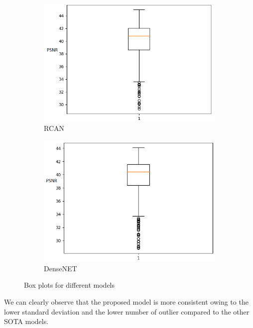 \begin{figure}[H]
  \begin{subfigure}[b]{0.275\textwidth}
    \includegraphics[width=\textwidth]{Chapter7/rcan_y.png}
    \caption{RCAN}
  \end{subfigure}
  \begin{subfigure}[b]{0.275\textwidth}
    \includegraphics[width=\textwidth]{Chapter7/dense_y.png}
    \caption{DenseNET}
  \end{subfigure}
 
    
    \caption[Box plots for different models.] {Box plots for different models}
    \label{fig:label7.9}
\end{figure}
We can clearly observe that the proposed model is more consistent owing to the lower standard deviation and the lower number of outlier compared to the other SOTA models.  



